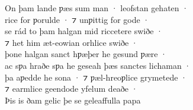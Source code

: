 \documentclass[10pt]{book}
\begin{document}
\begin{center}
{On þam lande ƿ\ae{}s sum man · leofstan gehaten · \\
rice for ƿorulde · ⁊ unƿittig for gode · \\
se r\'ad to þam halgan mid riccetere swiðe · \\
⁊ het him \ae{}t-eowian orhlice swiðe · \\
þone halgan sanct hƿ\ae{}þer he gesund ƿ\ae{}re · \\
ac sƿa hraðe sƿa he geseah þ\ae{}s sanctes lichaman · \\
þa aƿedde he sona · ⁊ ƿ\ae{}l-hreoƿlice grymetede · \\
⁊ earmlice geendode yfelum deaðe · \\
Þis is ðam gelic þe se geleaffulla papa \\
}
\end{center}


\settowidth{}
\end{document}
